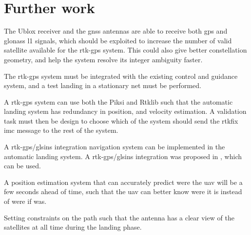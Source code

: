 \section{Further work}
The Ublox receiver and the \gls{gnss} antennas are able to receive both \gls{gps} and \gls{glonass} \gls{l1} signals, which should be exploited to increase the number of valid satellite available for the \gls{rtk-gps} system. This could also give better constellation geometry, and help the system resolve its integer ambiguity faster.

The \gls{rtk-gps} system must be integrated with the existing control and guidance system, and a test landing in a stationary net must be performed. 

A \gls{rtk-gps} system can use both the Piksi and Rtklib such that the automatic landing system has redundancy in position, and velocity estimation. A validation task must then be design to choose which of the system should send the rtkfix \gls{imc} message to the rest of the system.

A \gls{rtk-gps}/gls{ins} integration navigation system can be implemented in the automatic landing system. A \gls{rtk-gps}/gls{ins} integration was proposed in \citep{Spockeli}, which can be used.

A position estimation system that can accurately predict were the \gls{uav} will be a few seconds ahead of time, such that the \gls{uav} can better know were it is instead of were if was.

Setting constraints on the path such that the antenna has a clear view of the satellites at all time during the landing phase. 
\cleardoublepage